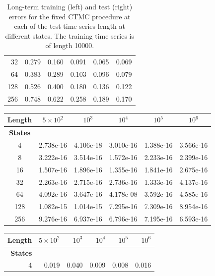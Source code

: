 \documentclass[review,letterpaper,11pt]{elsarticle}
\begin{document}
\begin{table}[tbh]
\begin{tabular}{rrrrrr}
       32         &  0.279 &  0.160 &  0.091 &  0.065 &  0.069 \\
       64         &  0.383 &  0.289 &  0.103 &  0.096 &  0.079 \\
      128         &  0.526 &  0.400 &  0.180 &  0.136 &  0.122 \\
      256         &  0.748 &  0.622 &  0.258 &  0.189 &  0.170 \\
\bottomrule
	\end{tabular}
\caption{Long-term training (left) and test (right) errors for the {\color{blue}fixed} CTMC procedure at each of the test time series length at different states. The training time series is of length 10000.}
\label{tab:ctmcLT}
\end{table}

\begin{table}[tbh]
\centering
\setlength\tabcolsep{3pt}
\begin{tabular}{cccccc}
\toprule
\textbf{Length} &   $5\times 10^2$     &   $10^3$    &   $10^4$   &   $10^5$  &   $10^6$ \\ \midrule
\textbf{States} &               &               &               &               &               \\
4           &  2.738e-16 &  4.106e-18 &  3.010e-16 &  1.388e-16 &  3.566e-16 \\
8           &  3.222e-16 &  3.514e-16 &  1.572e-16 &  2.233e-16 &  2.399e-16 \\
16          &  1.507e-16 &  1.896e-16 &  1.355e-16 &  1.841e-16 &  2.675e-16 \\
32          &  2.263e-16 &  2.715e-16 &  2.736e-16 &  1.333e-16 &  4.137e-16 \\
64          &  4.092e-16 &  3.647e-16 &  4.178e-08 &  3.592e-16 &  4.585e-16 \\
128         &  1.082e-15 &  1.014e-15 &  7.295e-16 &  7.309e-16 &  8.954e-16 \\
256         &  9.276e-16 &  6.937e-16 &  6.796e-16 &  7.195e-16 &  6.593e-16 \\
\bottomrule
\end{tabular} \hspace{1cm}
\begin{tabular}{rrrrrr}
	\toprule
	\textbf{Length} &   $5\times 10^2$     &   $10^3$    &   $10^4$   &   $10^5$  &   $10^6$ \\ \midrule
	\textbf{States} & & & & & \\
	4           &  0.019 &  0.040 &  0.009 &  0.008 &  0.016 \\

\end{tabular}
\end{table}
\end{document}
